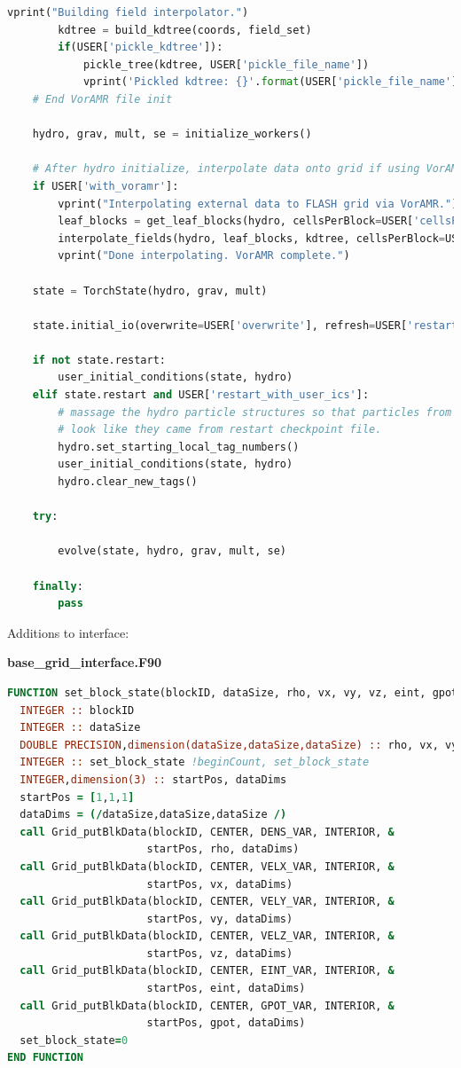 \documentclass[twoside]{drexel-thesis}
\begin{document}
\begin{lstlisting}[language=python]
        vprint("Building field interpolator.")
        kdtree = build_kdtree(coords, field_set)
        if(USER['pickle_kdtree']):
            pickle_tree(kdtree, USER['pickle_file_name'])
            vprint('Pickled kdtree: {}'.format(USER['pickle_file_name']))
    # End VorAMR file init
    
    hydro, grav, mult, se = initialize_workers()

    # After hydro initialize, interpolate data onto grid if using VorAMR.
    if USER['with_voramr']:
        vprint("Interpolating external data to FLASH grid via VorAMR.")
        leaf_blocks = get_leaf_blocks(hydro, cellsPerBlock=USER['cellsPerBlock'], numBlocks=USER['numBlocks'])
        interpolate_fields(hydro, leaf_blocks, kdtree, cellsPerBlock=USER['cellsPerBlock'])
        vprint("Done interpolating. VorAMR complete.")

    state = TorchState(hydro, grav, mult)

    state.initial_io(overwrite=USER['overwrite'], refresh=USER['restart_with_new_rng'])
    
    if not state.restart:
        user_initial_conditions(state, hydro)
    elif state.restart and USER['restart_with_user_ics']:
        # massage the hydro particle structures so that particles from user ICs
        # look like they came from restart checkpoint file.
        hydro.set_starting_local_tag_numbers()
        user_initial_conditions(state, hydro)
        hydro.clear_new_tags()

    try:

        evolve(state, hydro, grav, mult, se)

    finally:
        pass
\end{lstlisting}

\noindent Additions to  interface:

\noindent\textbf{base\_grid\_interface.F90}
\begin{lstlisting}[language=fortran]
FUNCTION set_block_state(blockID, dataSize, rho, vx, vy, vz, eint, gpot)
  INTEGER :: blockID
  INTEGER :: dataSize
  DOUBLE PRECISION,dimension(dataSize,dataSize,dataSize) :: rho, vx, vy, vz, eint, gpot
  INTEGER :: set_block_state !beginCount, set_block_state
  INTEGER,dimension(3) :: startPos, dataDims
  startPos = [1,1,1]
  dataDims = (/dataSize,dataSize,dataSize /)
  call Grid_putBlkData(blockID, CENTER, DENS_VAR, INTERIOR, &
                      startPos, rho, dataDims)
  call Grid_putBlkData(blockID, CENTER, VELX_VAR, INTERIOR, &
                      startPos, vx, dataDims)
  call Grid_putBlkData(blockID, CENTER, VELY_VAR, INTERIOR, &
                      startPos, vy, dataDims)
  call Grid_putBlkData(blockID, CENTER, VELZ_VAR, INTERIOR, &
                      startPos, vz, dataDims)
  call Grid_putBlkData(blockID, CENTER, EINT_VAR, INTERIOR, &
                      startPos, eint, dataDims)
  call Grid_putBlkData(blockID, CENTER, GPOT_VAR, INTERIOR, &
                      startPos, gpot, dataDims)
  set_block_state=0
END FUNCTION
\end{lstlisting}
\end{document}
